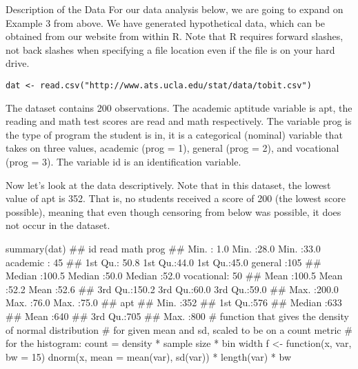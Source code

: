 \documentclass{beamer}
\begin{document}
\begin{frame}[fragile]
Description of the Data
For our data analysis below, we are going to expand on Example 3 from above. We have generated hypothetical data, which can be obtained from our website from within R. Note that R requires forward slashes, not back slashes when specifying a file location even if the file is on your hard drive.


\begin{verbatim}
dat <- read.csv("http://www.ats.ucla.edu/stat/data/tobit.csv")
\end{verbatim}
\end{frame}
\begin{frame}[fragile]
The dataset contains 200 observations. The academic aptitude variable is apt, the reading and math test scores are read and math respectively. The variable prog is the type of program the student is in, it is a categorical (nominal) variable that takes on three values, academic (prog = 1), general (prog = 2), and vocational (prog = 3). The variable id is an identification variable.

Now let's look at the data descriptively. Note that in this dataset, the lowest value of apt is 352. That is, no students received a score of 200 (the lowest score possible), meaning that even though censoring from below was possible, it does not occur in the dataset.
\end{frame}
\begin{frame}[fragile]
summary(dat)
##        id             read           math              prog    
##  Min.   :  1.0   Min.   :28.0   Min.   :33.0   academic  : 45  
##  1st Qu.: 50.8   1st Qu.:44.0   1st Qu.:45.0   general   :105  
##  Median :100.5   Median :50.0   Median :52.0   vocational: 50  
##  Mean   :100.5   Mean   :52.2   Mean   :52.6                   
##  3rd Qu.:150.2   3rd Qu.:60.0   3rd Qu.:59.0                   
##  Max.   :200.0   Max.   :76.0   Max.   :75.0                   
##       apt     
##  Min.   :352  
##  1st Qu.:576  
##  Median :633  
##  Mean   :640  
##  3rd Qu.:705  
##  Max.   :800
# function that gives the density of normal distribution
# for given mean and sd, scaled to be on a count metric
# for the histogram: count = density * sample size * bin width
f <- function(x, var, bw = 15) {
	dnorm(x, mean = mean(var), sd(var)) * length(var)  * bw
}
\end{frame}
\end{document}

